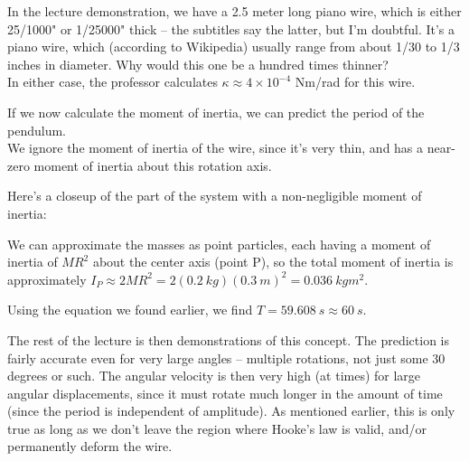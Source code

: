 In the lecture demonstration, we have a 2.5 meter long piano wire, which is either 25/1000" or 1/25000" thick -- the subtitles say the latter, but I'm doubtful. It's a piano wire, which (according to Wikipedia) usually range from about 1/30 to 1/3 inches in diameter. Why would this one be a hundred times thinner?\\
In either case, the professor calculates $\kappa \approx 4 \times 10^{-4}$ Nm/rad for this wire.

If we now calculate the moment of inertia, we can predict the period of the pendulum.\\
We ignore the moment of inertia of the wire, since it's very thin, and has a near-zero moment of inertia about this rotation axis.

Here's a closeup of the part of the system with a non-negligible moment of inertia:

\begin{figure}[H]
\centering
{}%
\end{figure}

We can approximate the masses as point particles, each having a moment of inertia of $M R^2$ about the center axis (point P), so the total moment of inertia is approximately $I_P \approx 2 M R^2 = 2(\SI{0.2}{kg})(\SI{0.3}{m})^2 = \SI{0.036}{kg m^2}$.

Using the equation we found earlier, we find $T = \SI{59.608}{s} \approx \SI{60}{s}$.

The rest of the lecture is then demonstrations of this concept. The prediction is fairly accurate even for very large angles -- multiple rotations, not just some 30 degrees or such. The angular velocity is then very high (at times) for large angular displacements, since it must rotate much longer in the amount of time (since the period is independent of amplitude). As mentioned earlier, this is only true as long as we don't leave the region where Hooke's law is valid, and/or permanently deform the wire.

